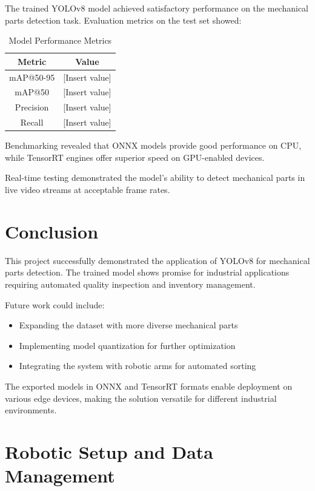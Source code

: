 \documentclass[12pt,a4paper]{article}
\begin{document}
The trained YOLOv8 model achieved satisfactory performance on the mechanical parts detection task. Evaluation metrics on the test set showed:

\begin{table}[H]
\centering
\begin{tabular}{|c|c|}
\hline
Metric & Value \\
\hline
mAP@50-95 & [Insert value] \\
\hline
mAP@50 & [Insert value] \\
\hline
Precision & [Insert value] \\
\hline
Recall & [Insert value] \\
\hline
\end{tabular}
\caption{Model Performance Metrics}
\end{table}

Benchmarking revealed that ONNX models provide good performance on CPU, while TensorRT engines offer superior speed on GPU-enabled devices.

Real-time testing demonstrated the model's ability to detect mechanical parts in live video streams at acceptable frame rates.

\section{Conclusion}

This project successfully demonstrated the application of YOLOv8 for mechanical parts detection. The trained model shows promise for industrial applications requiring automated quality inspection and inventory management.

Future work could include:
\begin{itemize}
\item Expanding the dataset with more diverse mechanical parts
\item Implementing model quantization for further optimization
\item Integrating the system with robotic arms for automated sorting
\end{itemize}

The exported models in ONNX and TensorRT formats enable deployment on various edge devices, making the solution versatile for different industrial environments.

\section{Robotic Setup and Data Management}
\end{document}
